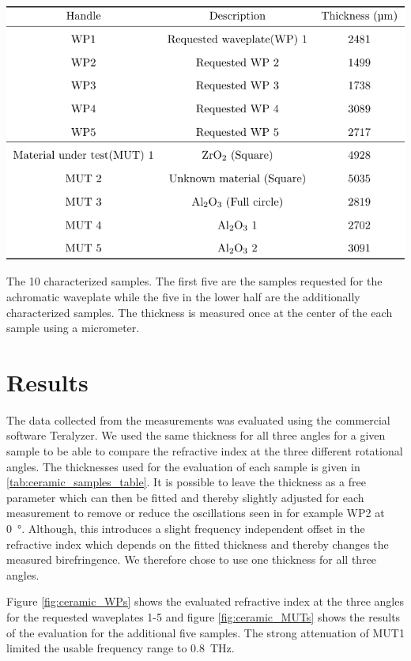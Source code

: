 \begin{table}[h]
    \centering
    \includegraphics[scale=1.0]{images/7_appendix/ceramic_samples_table.pdf}
    \caption{The 10 characterized samples. The first five are the samples requested for the achromatic waveplate while the five in the lower half are the additionally characterized samples. The thickness is measured once at the center of the each sample using a micrometer.}
    \label{tab:ceramic_samples_table}
\end{table}

\newpage

\section{Results}
The data collected from the measurements was evaluated using the commercial software Teralyzer. We used the same thickness for all three angles for a given sample to be able to compare the refractive index at the three different rotational angles. The thicknesses used for the evaluation of each sample is given in \ref{tab:ceramic_samples_table}. 
It is possible to leave the thickness as a free parameter which can then be fitted and thereby slightly adjusted for each measurement to remove or reduce the oscillations seen in for example WP2 at \SI{0}{\degree}. Although, this introduces a slight frequency independent offset in the refractive index which depends on the fitted thickness and thereby changes the measured birefringence. We therefore chose to use one thickness for all three angles. 

Figure \ref{fig:ceramic_WPs} shows the evaluated refractive index at the three angles for the requested waveplates 1-5 and figure \ref{fig:ceramic_MUTs} shows the results of the evaluation for the additional five samples. The strong attenuation of MUT1 limited the usable frequency range to \SI{0.8}{\tera \hertz}. 

